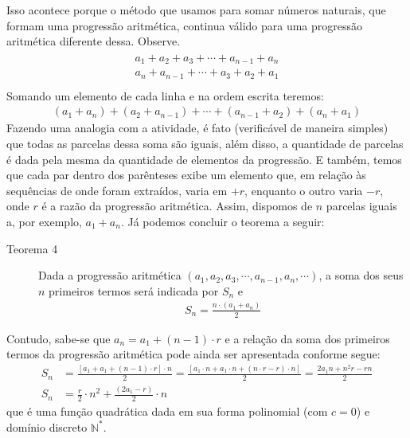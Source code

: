 Isso acontece porque o método que usamos para somar números naturais, que formam uma progressão aritmética, continua válido para uma progressão aritmética diferente dessa. Observe.
\begin{align*}\!\begin{aligned}
a_{1}+a_{2}+a_{3}+ \cdots +a_{n-1}+a_{n}\\
a_{n}+a_{n-1}+ \cdots +a_{3}+a_{2}+a_{1}\\
\end{aligned}\end{align*}
Somando um elemento de cada linha e na ordem escrita teremos:
\begin{equation*}
\begin{split}(a_{1}+a_{n})+(a_{2}+a_{n-1})+ \cdots + (a_{n-1}+a_{2})+(a_{n}+a_{1})\end{split}
\end{equation*}
Fazendo uma analogia com a atividade, é fato (verificável de maneira simples) que todas as parcelas dessa soma são iguais, além disso, a quantidade de parcelas é dada pela mesma da quantidade de elementos da progressão. E também, temos que cada par dentro dos parênteses exibe um elemento que, em relação às sequências de onde foram extraídos, varia em \(+r\), enquanto o outro varia \(-r\), onde \(r\) é a razão da progressão aritmética. Assim, dispomos de \(n\) parcelas iguais a, por exemplo, \(a_{1}+a_{n}\). Já podemos concluir o teorema a seguir:

\begin{description}
\item[Teorema 4]

Dada a progressão aritmética \((a_{1},a_{2},a_{3}, \cdots ,a_{n-1},a_{n}, \cdots)\), a soma dos seus \(n\) primeiros termos será indicada por \(S_{n}\) e
\begin{equation*}
\begin{split}S_{n} = \frac{n \cdot (a_{1}+a_{n})}{2}\end{split}
\end{equation*}\end{description}

Contudo, sabe-se que \(a_{n}=a_{1}+(n-1)\cdot r\) e a relação da soma dos primeiros termos da progressão aritmética pode ainda ser apresentada conforme segue:
\begin{align*}
S_{n}&=\frac{[a_1+a_{1}+(n-1)\cdot r] \cdot n}{2}= \frac{[a_1 \cdot n +a_{1}  \cdot n + (n \cdot r-r)\cdot n]}{2}= \frac{2a_{1}n+n^2r-rn}{2}\\
S_{n}&=\frac{r}{2} \cdot n^2 + \frac{(2a_{1}-r)}{2} \cdot n
\end{align*}
que é uma função quadrática dada em sua forma polinomial (com \(c=0\)) e domínio discreto \(\mathbb{N}^*\).

